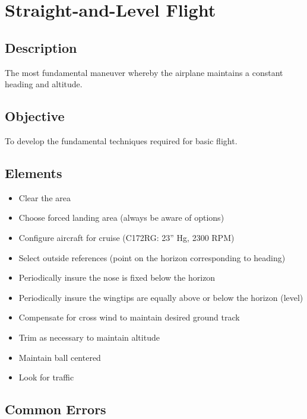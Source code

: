 \section{Straight-and-Level Flight}

\subsection{Description}

The most fundamental maneuver whereby the airplane maintains a constant heading
and altitude.

\subsection{Objective}

To develop the fundamental techniques required for basic flight.

\subsection{Elements}

\begin{itemize}
  \item Clear the area
  \item Choose forced landing area (always be aware of options) 
  \item Configure aircraft for cruise (C172RG: 23'' Hg, 2300 RPM)
  \item Select outside references (point on the horizon corresponding to
    heading)
  \item Periodically insure the nose is fixed below the horizon
  \item Periodically insure the wingtips are equally above or below the horizon
    (level)
  \item Compensate for cross wind to maintain desired ground track
  \item Trim as necessary to maintain altitude
  \item Maintain ball centered
  \item Look for traffic
\end{itemize}

\subsection{Common Errors}

